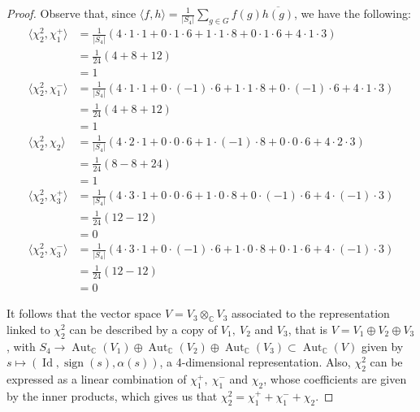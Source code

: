 \documentclass{article}
\newcommand{\numberset}{\mathbb}
\newcommand{\C}{\numberset{C}}
\DeclareMathOperator{\Id}{Id}
\DeclareMathOperator{\Aut}{Aut}
\DeclareMathOperator{\sign}{sign}
\begin{document}
\begin{proof}
   Observe that, since $\langle f,h\rangle=\frac{1}{|S_4|}\sum_{g\in G}f(g)
   \overline{h(g)}$, we have the following:
    \begin{align*}
        \langle\chi^2_2,\chi^+_1\rangle & =\frac{1}{|S_4|}(4\cdot 1\cdot
        1+0\cdot 1\cdot 6+1\cdot 1\cdot 8+0\cdot 1\cdot 6+4\cdot 1\cdot 3) \\
        & =\frac{1}{24}(4+8+12) \\
        &=1 \\
        \langle\chi^2_2,\chi^-_1\rangle &=\frac{1}{|S_4|}(4\cdot 1\cdot
        1+0\cdot(-1)\cdot 6+1\cdot 1\cdot 8+0\cdot(-1)\cdot 6+4\cdot 1\cdot 3)
        \\
        &=\frac{1}{24}(4+8+12) \\
        &=1 \\
        \langle\chi^2_2,\chi_2\rangle
        &=\frac{1}{|S_4|}(4\cdot2\cdot1+0\cdot0\cdot6+1\cdot(-1)\cdot8
        +0\cdot0\cdot6+4\cdot2\cdot3) \\
        &=\frac{1}{24}(8-8+24) \\
        &=1 \\
        \langle\chi^2_2,\chi^+_3\rangle &=\frac{1}{|S_4|}(4\cdot 3\cdot 1+0\cdot
        0\cdot 6+1\cdot 0\cdot 8+0\cdot (-1)\cdot 6+4\cdot (-1)\cdot 3) \\
        &=\frac{1}{24}(12-12) \\
        &=0
    \end{align*}
    \begin{align*}
        \langle\chi^2_2,\chi^-_3\rangle
        &=\frac{1}{|S_4|}(4\cdot3\cdot1+0\cdot(-1)\cdot6+
        1\cdot0\cdot8+0\cdot1\cdot6+4\cdot(-1)\cdot3) \\
        &=\frac{1}{24}(12-12) \\
        &=0 
    \end{align*}

    It follows that the vector space $V=V_3\otimes_\C V_3$ associated to the
    representation linked to $\chi_2^2$ can be described by a copy of $V_1,\
    V_2$ and $V_3$, that is $V=V_1\oplus V_2\oplus V_3$, with
    $S_4\rightarrow\Aut_\C(V_1)\oplus\Aut_\C(V_2)\oplus\Aut_\C(V_3)\subset
    \Aut_\C(V)$ given by $s\mapsto (\Id,\sign(s),\alpha(s))$, a 4-dimensional
    representation. Also, $\chi^2_2$ can be expressed as a linear combination of
    $\chi_1^+,\ \chi_1^-$ and $\chi_2$, whose coefficients are given by the
    inner products, which gives us that $\chi_2^2=\chi_1^++\chi_1^-+\chi_2$.
\end{proof}


\printbibliography
\end{document}
